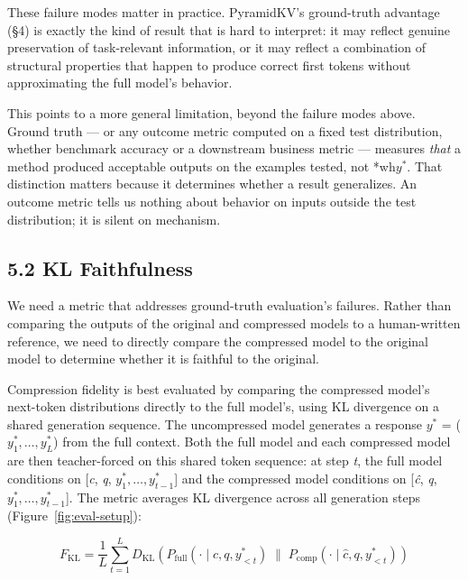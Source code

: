 \documentclass[10pt,letterpaper]{article}
\begin{document}
These failure modes matter in practice. PyramidKV's ground-truth
advantage (§4) is exactly the kind of result that is hard to interpret:
it may reflect genuine preservation of task-relevant information, or it
may reflect a combination of structural properties that happen to
produce correct first tokens without approximating the full model's
behavior.

This points to a more general limitation, beyond the failure modes
above. Ground truth --- or any outcome metric computed on a fixed test
distribution, whether benchmark accuracy or a downstream business metric
--- measures \emph{that} a method produced acceptable outputs on the
examples tested, not *wh\(y^*\). That distinction matters because it
determines whether a result generalizes. An outcome metric tells us
nothing about behavior on inputs outside the test distribution; it is
silent on mechanism.

\hypertarget{kl-faithfulness}{%
\subsection{5.2 KL Faithfulness}\label{kl-faithfulness}}

We need a metric that addresses ground-truth evaluation's failures. Rather than comparing
the outputs of the original and compressed models to a human-written reference,
we need to directly compare the compressed model to the original model to determine
whether it is faithful to the original.

Compression fidelity is best evaluated by comparing the compressed model's next-token
distributions directly to the full model's, using KL divergence on a shared
generation sequence. The uncompressed model generates a response \(y^*\)
= (\(y^*_1, \ldots, y^*_L\)) from the full context. Both the full model
and each compressed model are then teacher-forced on this shared token
sequence: at step \emph{t}, the full model conditions on {[}\emph{c},
\emph{q}, \(y^*_1, \ldots, y^*_{t-1}\){]} and the compressed model
conditions on {[}\emph{ĉ}, \emph{q}, \(y^*_1, \ldots, y^*_{t-1}\){]}.
The metric averages KL divergence across all generation steps
(Figure~\ref{fig:eval-setup}):

\[
F_{\text{KL}} = \frac{1}{L} \sum_{t=1}^{L}
  D_{\text{KL}}\!\left(
    P_{\text{full}}(\cdot \mid c, q, y^*_{<t})
    \;\bigg\|\;
    P_{\text{comp}}(\cdot \mid \hat{c}, q, y^*_{<t})
  \right)
\]
\end{document}
